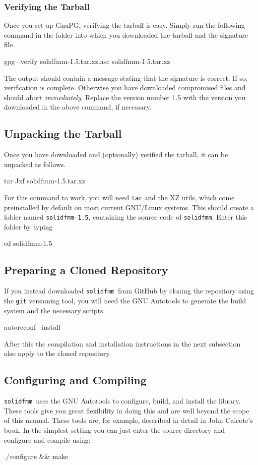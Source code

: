 \documentclass{scrbook}
\newcommand{\solidfmm}{\texttt{solidfmm}}
\begin{document}
\subsubsection{Verifying the Tarball}
Once you set up GnuPG, verifying the tarball is easy. Simply run the following
command in the folder into which you downloaded the tarball and the signature
file. 
\begin{commandshell*}
gpg --verify solidfmm-1.5.tar.xz.asc solidfmm-1.5.tar.xz
\end{commandshell*}
The output should contain a message stating that the signature is correct. If
so, verification is complete. Otherwise you have downloaded compromised files
and should abort \emph{immediately}. Replace the version number {1{.}5} with the
version you downloaded in the above command, if necessary.

\subsection{Unpacking the Tarball}
Once you have downloaded and (optionally) verified the tarball, it can be
unpacked as follows.
\begin{commandshell*}
tar Jxf solidfmm-1.5.tar.xz
\end{commandshell*}
For this command to work, you will need \lstinline|tar|\autocite{gnutar} and the
XZ utils\autocite{xzutils}, which come preinstalled by default on most current
GNU/Linux systems. This should create a folder named \lstinline|solidfmm-1.5|,
containing the source code of \solidfmm. Enter this folder by typing
\begin{commandshell*}
cd solidfmm-1.5
\end{commandshell*}

\subsection{Preparing a Cloned Repository}
If you instead  downloaded \solidfmm\ from GitHub by cloning the repository
using the \lstinline|git| versioning tool, you will need the GNU Autotools to
generate the build system and the necessary scripts.
\begin{commandshell*}
autoreconf --install
\end{commandshell*}
After this the compilation and installation instructions in the next subsection
also apply to the cloned repository.

\subsection{Configuring and Compiling}
\solidfmm\ uses the GNU Autotools to configure, build, and install the library.
These tools give you great flexibility in doing this and are well beyond the
scope of this manual. These tools are, for example, described in detail in John
Calcote's book\autocite{calcote2010}. In the simplest setting you can just
enter the source directory and configure and compile using:
\begin{commandshell*}
./configure && make
\end{commandshell*}
\end{document}
